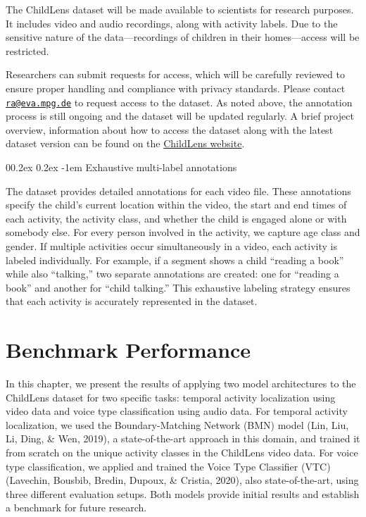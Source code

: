 \documentclass[
  man,floatsintext]{apa6}
\makeatletter
\let\oldparagraph\paragraph
\renewcommand{\paragraph}{
    \@ifstar
      \xxxParagraphStar
      \xxxParagraphNoStar
  }
\newcommand{\xxxParagraphStar}[1]{\oldparagraph*{#1}\mbox{}}
\newcommand{\xxxParagraphNoStar}[1]{\oldparagraph{#1}\mbox{}}
\renewcommand{\paragraph}{\@startsection{paragraph}{4}{\parindent}%
  {0\baselineskip \@plus 0.2ex \@minus 0.2ex}%
  {-1em}%
  {\normalfont\normalsize\bfseries\itshape\typesectitle}}
\makeatother
\begin{document}
The ChildLens dataset will be made available to scientists for research purposes. It includes video and audio recordings, along with activity labels. Due to the sensitive nature of the data---recordings of children in their homes---access will be restricted.

Researchers can submit requests for access, which will be carefully reviewed to ensure proper handling and compliance with privacy standards. Please contact \href{mailto:ra@eva.mpg.de}{\nolinkurl{ra@eva.mpg.de}} to request access to the dataset. As noted above, the annotation process is still ongoing and the dataset will be updated regularly. A brief project overview, information about how to access the dataset along with the latest dataset version can be found on the \href{https://www.eva.mpg.de/comparative-cultural-psychology/technical-development/childlens/}{ChildLens website}.

\paragraph{Exhaustive multi-label annotations}\label{exhaustive-multi-label-annotations}

The dataset provides detailed annotations for each video file. These annotations specify the child's current location within the video, the start and end times of each activity, the activity class, and whether the child is engaged alone or with somebody else. For every person involved in the activity, we capture age class and gender. If multiple activities occur simultaneously in a video, each activity is labeled individually. For example, if a segment shows a child ``reading a book'' while also ``talking,'' two separate annotations are created: one for ``reading a book'' and another for ``child talking.'' This exhaustive labeling strategy ensures that each activity is accurately represented in the dataset.

\section{Benchmark Performance}\label{benchmark-performance}

In this chapter, we present the results of applying two model architectures to the ChildLens dataset for two specific tasks: temporal activity localization using video data and voice type classification using audio data. For temporal activity localization, we used the Boundary-Matching Network (BMN) model (Lin, Liu, Li, Ding, \& Wen, 2019), a state-of-the-art approach in this domain, and trained it from scratch on the unique activity classes in the ChildLens video data. For voice type classification, we applied and trained the Voice Type Classifier (VTC) (Lavechin, Bousbib, Bredin, Dupoux, \& Cristia, 2020), also state-of-the-art, using three different evaluation setups. Both models provide initial results and establish a benchmark for future research.
\end{document}
